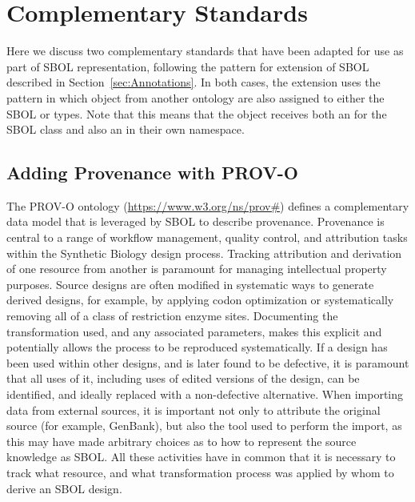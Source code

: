 \section{Complementary Standards}
\label{sec:complementaryStandards}

Here we discuss two complementary standards that have been adapted for use as part of SBOL representation, following the pattern for extension of SBOL described in Section~\ref{sec:Annotations}.
In both cases, the extension uses the pattern in which object from another ontology are also assigned to either the SBOL  or  types.
Note that this means that the object receives both an  for the SBOL class and also an  in their own namespace.

\subsection{Adding Provenance with PROV-O}
\label{sec:provenance}
\label{sec:prov:Entity}

The PROV-O ontology (\url{https://www.w3.org/ns/prov#}) defines a complementary data model that is leveraged by SBOL to describe provenance. Provenance is central to a range of workflow management, quality control, and attribution tasks within the Synthetic Biology design process. Tracking attribution and derivation of one resource from another is paramount for managing intellectual property purposes. Source designs are often modified in systematic ways to generate derived designs, for example, by applying codon optimization or systematically removing all of a class of restriction enzyme sites.  Documenting the transformation used, and any associated parameters, makes this explicit and potentially allows the process to be reproduced systematically. If a design has been used within other designs, and is later found to be defective, it is paramount that all uses of it, including uses of edited versions of the design, can be identified, and ideally replaced with a non-defective alternative. When importing data from external sources, it is important not only to attribute the original source (for example, GenBank), but also the tool used to perform the import, as this may have made arbitrary choices as to how to represent the source knowledge as SBOL. All these activities have in common that it is necessary to track what resource, and what transformation process was applied by whom to derive an SBOL design.

